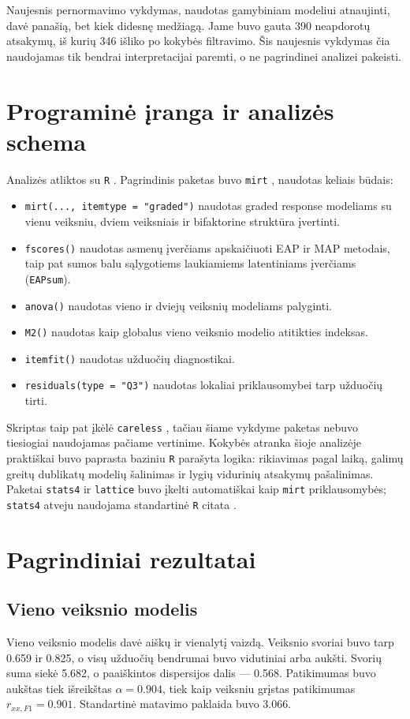 \documentclass[11pt,a4paper]{article}
\begin{document}
Naujesnis pernormavimo vykdymas, naudotas gamybiniam modeliui atnaujinti, davė panašią, bet kiek didesnę medžiagą. Jame buvo gauta 390 neapdorotų atsakymų, iš kurių 346 išliko po kokybės filtravimo. Šis naujesnis vykdymas čia naudojamas tik bendrai interpretacijai paremti, o ne pagrindinei analizei pakeisti.

\section{Programinė įranga ir analizės schema}
Analizės atliktos su \texttt{R} \parencite{RCore2026}. Pagrindinis paketas buvo \texttt{mirt} \parencite{Chalmers2012mirt}, naudotas keliais būdais:

\begin{itemize}
\item \texttt{mirt(..., itemtype = "graded")} naudotas graded response modeliams su vienu veiksniu, dviem veiksniais ir bifaktorine struktūra įvertinti.
\item \texttt{fscores()} naudotas asmenų įverčiams apskaičiuoti EAP ir MAP metodais, taip pat sumos balu sąlygotiems laukiamiems latentiniams įverčiams (\texttt{EAPsum}).
\item \texttt{anova()} naudotas vieno ir dviejų veiksnių modeliams palyginti.
\item \texttt{M2()} naudotas kaip globalus vieno veiksnio modelio atitikties indeksas.
\item \texttt{itemfit()} naudotas užduočių diagnostikai.
\item \texttt{residuals(type = "Q3")} naudotas lokaliai priklausomybei tarp užduočių tirti.
\end{itemize}

Skriptas taip pat įkėlė \texttt{careless} \parencite{YentesWilhelm2023careless}, tačiau šiame vykdyme paketas nebuvo tiesiogiai naudojamas pačiame vertinime. Kokybės atranka šioje analizėje praktiškai buvo paprasta baziniu \texttt{R} parašyta logika: rikiavimas pagal laiką, galimų greitų dublikatų modelių šalinimas ir lygių vidurinių atsakymų pašalinimas. Paketai \texttt{stats4} ir \texttt{lattice} \parencite{Sarkar2008lattice} buvo įkelti automatiškai kaip \texttt{mirt} priklausomybės; \texttt{stats4} atveju naudojama standartinė \texttt{R} citata \parencite{RCore2026}.

\section{Pagrindiniai rezultatai}
\subsection{Vieno veiksnio modelis}
Vieno veiksnio modelis davė aiškų ir vienalytį vaizdą. Veiksnio svoriai buvo tarp 0.659 ir 0.825, o visų užduočių bendrumai buvo vidutiniai arba aukšti. Svorių suma siekė 5.682, o paaiškintos dispersijos dalis — 0.568. Patikimumas buvo aukštas tiek išreikštas $\alpha = 0.904$, tiek kaip veiksniu grįstas patikimumas $r_{xx,F1} = 0.901$. Standartinė matavimo paklaida buvo 3.066.
\end{document}
